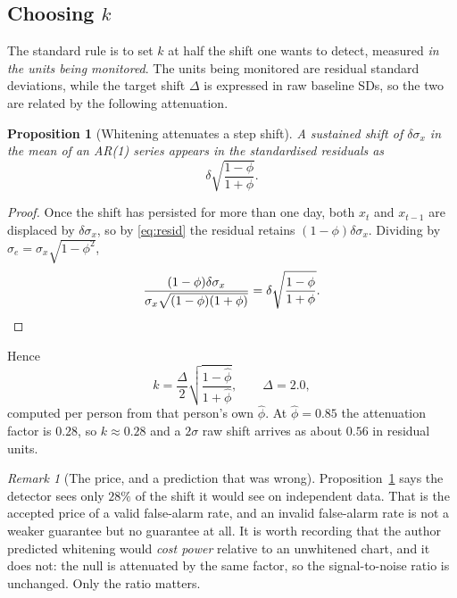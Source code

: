 \documentclass{article}
\theoremstyle{plain}
\newtheorem{proposition}[theorem]{Proposition}
\theoremstyle{definition}
\theoremstyle{remark}
\newtheorem{remark}{Remark}[section]
\numberwithin{equation}{section}
\begin{document}
\subsection{Choosing $k$}

The standard rule is to set $k$ at half the shift one wants to detect,
measured \emph{in the units being monitored}. The units being monitored are
residual standard deviations, while the target shift $\Delta$ is expressed in
raw baseline SDs, so the two are related by the following attenuation.

\begin{proposition}[Whitening attenuates a step shift]
\label{prop:atten}
A sustained shift of $\delta\sigma_x$ in the mean of an AR(1) series appears in
the standardised residuals as
\[
  \delta\sqrt{\frac{1-\phi}{1+\phi}} .
\]
\end{proposition}

\begin{proof}
Once the shift has persisted for more than one day, both $x_t$ and $x_{t-1}$
are displaced by $\delta\sigma_x$, so by \eqref{eq:resid} the residual retains
$(1-\phi)\delta\sigma_x$. Dividing by
$\sigma_e = \sigma_x\sqrt{1-\phi^2}$,
\[
  \frac{(1-\phi)\delta\sigma_x}{\sigma_x\sqrt{(1-\phi)(1+\phi)}}
  = \delta\sqrt{\frac{1-\phi}{1+\phi}} . \qedhere
\]
\end{proof}

Hence
\begin{equation}
\label{eq:k}
  k = \frac{\Delta}{2}\sqrt{\frac{1-\hat\phi}{1+\hat\phi}},
  \qquad \Delta = 2.0,
\end{equation}
computed per person from that person's own $\hat\phi$. At $\hat\phi = 0.85$
the attenuation factor is $0.28$, so $k \approx 0.28$ and a $2\sigma$ raw
shift arrives as about $0.56$ in residual units.

\begin{remark}[The price, and a prediction that was wrong]
Proposition~\ref{prop:atten} says the detector sees only $28\%$ of the shift it
would see on independent data. That is the accepted price of a valid
false-alarm rate, and an invalid false-alarm rate is not a weaker guarantee but
no guarantee at all. It is worth recording that the author predicted whitening
would \emph{cost power} relative to an unwhitened chart, and it does not: the
null is attenuated by the same factor, so the signal-to-noise ratio is
unchanged. Only the ratio matters.
\end{remark}

\end{document}
